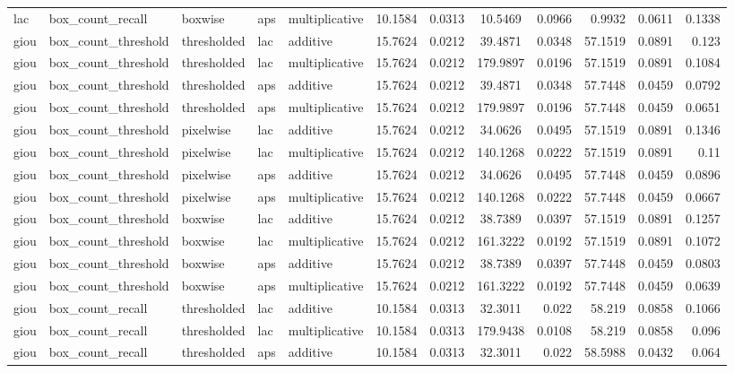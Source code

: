 \begin{table*}[htbp]
\begin{tabular}{@{}lllll rrcrrcr@{}}
lac & box\_count\_recall & boxwise & aps & multiplicative & 10.1584 & 0.0313 & 10.5469 & 0.0966 & 0.9932 & 0.0611 & 0.1338 \\
giou & box\_count\_threshold & thresholded & lac & additive & 15.7624 & 0.0212 & 39.4871 & 0.0348 & 57.1519 & 0.0891 & 0.123 \\
giou & box\_count\_threshold & thresholded & lac & multiplicative & 15.7624 & 0.0212 & 179.9897 & 0.0196 & 57.1519 & 0.0891 & 0.1084 \\
giou & box\_count\_threshold & thresholded & aps & additive & 15.7624 & 0.0212 & 39.4871 & 0.0348 & 57.7448 & 0.0459 & 0.0792 \\
giou & box\_count\_threshold & thresholded & aps & multiplicative & 15.7624 & 0.0212 & 179.9897 & 0.0196 & 57.7448 & 0.0459 & 0.0651 \\
giou & box\_count\_threshold & pixelwise & lac & additive & 15.7624 & 0.0212 & 34.0626 & 0.0495 & 57.1519 & 0.0891 & 0.1346 \\
giou & box\_count\_threshold & pixelwise & lac & multiplicative & 15.7624 & 0.0212 & 140.1268 & 0.0222 & 57.1519 & 0.0891 & 0.11 \\
giou & box\_count\_threshold & pixelwise & aps & additive & 15.7624 & 0.0212 & 34.0626 & 0.0495 & 57.7448 & 0.0459 & 0.0896 \\
giou & box\_count\_threshold & pixelwise & aps & multiplicative & 15.7624 & 0.0212 & 140.1268 & 0.0222 & 57.7448 & 0.0459 & 0.0667 \\
giou & box\_count\_threshold & boxwise & lac & additive & 15.7624 & 0.0212 & 38.7389 & 0.0397 & 57.1519 & 0.0891 & 0.1257 \\
giou & box\_count\_threshold & boxwise & lac & multiplicative & 15.7624 & 0.0212 & 161.3222 & 0.0192 & 57.1519 & 0.0891 & 0.1072 \\
giou & box\_count\_threshold & boxwise & aps & additive & 15.7624 & 0.0212 & 38.7389 & 0.0397 & 57.7448 & 0.0459 & 0.0803 \\
giou & box\_count\_threshold & boxwise & aps & multiplicative & 15.7624 & 0.0212 & 161.3222 & 0.0192 & 57.7448 & 0.0459 & 0.0639 \\
giou & box\_count\_recall & thresholded & lac & additive & 10.1584 & 0.0313 & 32.3011 & 0.022 & 58.219 & 0.0858 & 0.1066 \\
giou & box\_count\_recall & thresholded & lac & multiplicative & 10.1584 & 0.0313 & 179.9438 & 0.0108 & 58.219 & 0.0858 & 0.096 \\
giou & box\_count\_recall & thresholded & aps & additive & 10.1584 & 0.0313 & 32.3011 & 0.022 & 58.5988 & 0.0432 & 0.064 \\

\end{tabular}
\end{table*}
